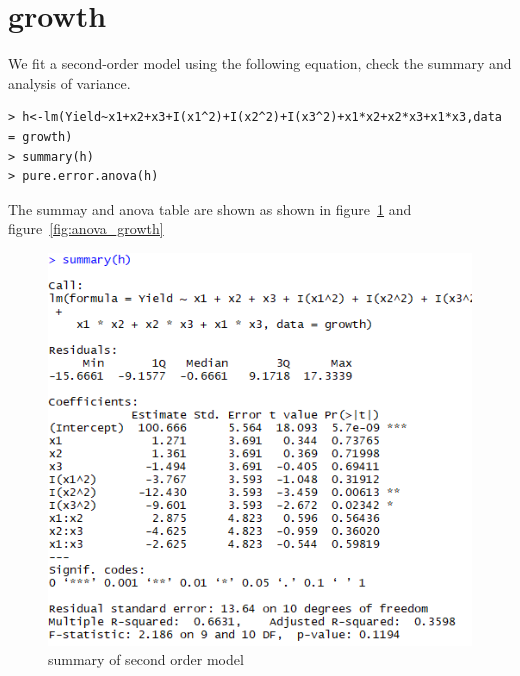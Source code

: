 \documentclass[11pt]{article}
\begin{document}



\section{growth}
\label{sec:1}

We fit a second-order model using the following equation, check the summary and analysis of variance.
\begin{verbatim}
> h<-lm(Yield~x1+x2+x3+I(x1^2)+I(x2^2)+I(x3^2)+x1*x2+x2*x3+x1*x3,data = growth)
> summary(h)
> pure.error.anova(h)
\end{verbatim}
The summay and anova table are shown as shown in figure~\ref{fig:summary_growth} and figure~\ref{fig:anova_growth}
\begin{figure}[h!]

  \center
  \includegraphics[scale = .45]{pictures/summary_growth.png}
  \caption{summary of second order model}
  \label{fig:summary_growth}
\end{figure}
\end{document}
